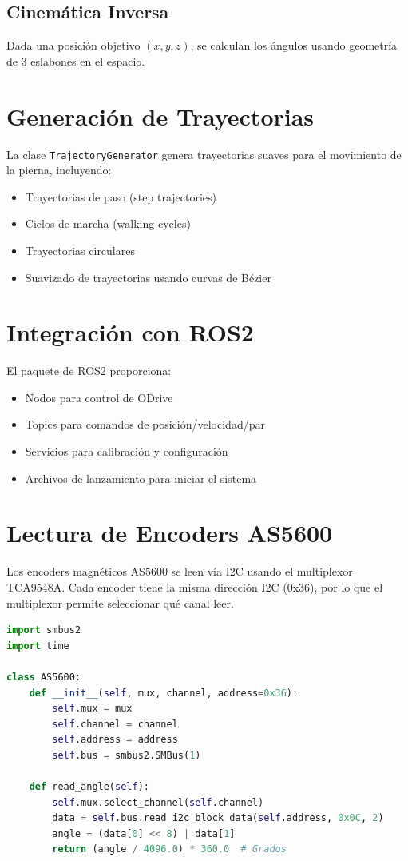 \subsection{Cinemática Inversa}
Dada una posición objetivo $(x, y, z)$, se calculan los ángulos usando geometría de 3 eslabones en el espacio.

\section{Generación de Trayectorias}

La clase \texttt{TrajectoryGenerator} genera trayectorias suaves para el movimiento de la pierna, incluyendo:

\begin{itemize}
    \item Trayectorias de paso (step trajectories)
    \item Ciclos de marcha (walking cycles)
    \item Trayectorias circulares
    \item Suavizado de trayectorias usando curvas de Bézier
\end{itemize}

\section{Integración con ROS2}

El paquete de ROS2 proporciona:
\begin{itemize}
    \item Nodos para control de ODrive
    \item Topics para comandos de posición/velocidad/par
    \item Servicios para calibración y configuración
    \item Archivos de lanzamiento para iniciar el sistema
\end{itemize}

\section{Lectura de Encoders AS5600}

Los encoders magnéticos AS5600 se leen vía I2C usando el multiplexor TCA9548A. Cada encoder tiene la misma dirección I2C (0x36), por lo que el multiplexor permite seleccionar qué canal leer.

\begin{lstlisting}[language=Python, caption=Lectura de encoder AS5600 vía TCA9548A]
import smbus2
import time

class AS5600:
    def __init__(self, mux, channel, address=0x36):
        self.mux = mux
        self.channel = channel
        self.address = address
        self.bus = smbus2.SMBus(1)
    
    def read_angle(self):
        self.mux.select_channel(self.channel)
        data = self.bus.read_i2c_block_data(self.address, 0x0C, 2)
        angle = (data[0] << 8) | data[1]
        return (angle / 4096.0) * 360.0  # Grados
\end{lstlisting}
